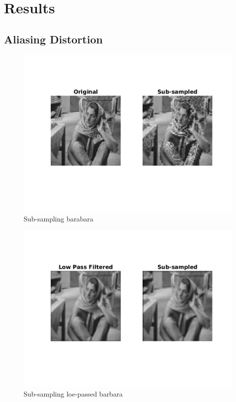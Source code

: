 \section{Results}

\subsection{Aliasing Distortion}

\begin{figure}[H]
    \centering
    \includegraphics[scale=0.75]{sub_sampled.png}
    \caption{Sub-sampling barabara}
\end{figure}

\begin{figure}[H]
    \centering
    \includegraphics[scale=0.75]{low_pass_sub_sampled.png}
    \caption{Sub-sampling loe-passed barbara}
\end{figure}

